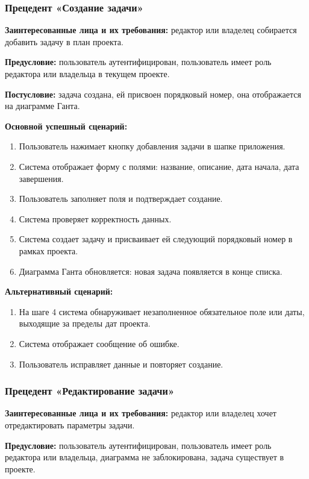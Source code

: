 \subsubsection{Прецедент «Создание задачи»}

\textbf{Заинтересованные лица и их требования:} редактор или владелец собирается добавить задачу в план проекта.

\textbf{Предусловие:} пользователь аутентифицирован, пользователь имеет роль редактора или владельца в текущем проекте.

\textbf{Постусловие:} задача создана, ей присвоен порядковый номер, она отображается на диаграмме Ганта.

\textbf{Основной успешный сценарий:}
\begin{enumerate}
    \item Пользователь нажимает кнопку добавления задачи в шапке приложения.
    \item Система отображает форму с полями: название, описание, дата начала, дата завершения.
    \item Пользователь заполняет поля и подтверждает создание.
    \item Система проверяет корректность данных.
    \item Система создает задачу и присваивает ей следующий порядковый номер в рамках проекта.
    \item Диаграмма Ганта обновляется: новая задача появляется в конце списка.
\end{enumerate}

\textbf{Альтернативный сценарий:}
\begin{enumerate}
    \item На шаге 4 система обнаруживает незаполненное обязательное поле или даты, выходящие за пределы дат проекта.
    \item Система отображает сообщение об ошибке.
    \item Пользователь исправляет данные и повторяет создание.
\end{enumerate}

\subsubsection{Прецедент «Редактирование задачи»}

\textbf{Заинтересованные лица и их требования:} редактор или владелец хочет отредактировать параметры задачи.

\textbf{Предусловие:} пользователь аутентифицирован, пользователь имеет роль редактора или владельца, диаграмма не заблокирована, задача существует в проекте.

